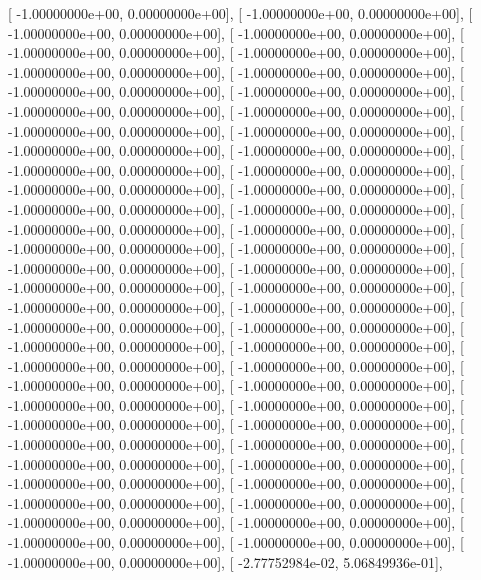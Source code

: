 \documentclass{article}
\begin{document}
       [ -1.00000000e+00,   0.00000000e+00],
       [ -1.00000000e+00,   0.00000000e+00],
       [ -1.00000000e+00,   0.00000000e+00],
       [ -1.00000000e+00,   0.00000000e+00],
       [ -1.00000000e+00,   0.00000000e+00],
       [ -1.00000000e+00,   0.00000000e+00],
       [ -1.00000000e+00,   0.00000000e+00],
       [ -1.00000000e+00,   0.00000000e+00],
       [ -1.00000000e+00,   0.00000000e+00],
       [ -1.00000000e+00,   0.00000000e+00],
       [ -1.00000000e+00,   0.00000000e+00],
       [ -1.00000000e+00,   0.00000000e+00],
       [ -1.00000000e+00,   0.00000000e+00],
       [ -1.00000000e+00,   0.00000000e+00],
       [ -1.00000000e+00,   0.00000000e+00],
       [ -1.00000000e+00,   0.00000000e+00],
       [ -1.00000000e+00,   0.00000000e+00],
       [ -1.00000000e+00,   0.00000000e+00],
       [ -1.00000000e+00,   0.00000000e+00],
       [ -1.00000000e+00,   0.00000000e+00],
       [ -1.00000000e+00,   0.00000000e+00],
       [ -1.00000000e+00,   0.00000000e+00],
       [ -1.00000000e+00,   0.00000000e+00],
       [ -1.00000000e+00,   0.00000000e+00],
       [ -1.00000000e+00,   0.00000000e+00],
       [ -1.00000000e+00,   0.00000000e+00],
       [ -1.00000000e+00,   0.00000000e+00],
       [ -1.00000000e+00,   0.00000000e+00],
       [ -1.00000000e+00,   0.00000000e+00],
       [ -1.00000000e+00,   0.00000000e+00],
       [ -1.00000000e+00,   0.00000000e+00],
       [ -1.00000000e+00,   0.00000000e+00],
       [ -1.00000000e+00,   0.00000000e+00],
       [ -1.00000000e+00,   0.00000000e+00],
       [ -1.00000000e+00,   0.00000000e+00],
       [ -1.00000000e+00,   0.00000000e+00],
       [ -1.00000000e+00,   0.00000000e+00],
       [ -1.00000000e+00,   0.00000000e+00],
       [ -1.00000000e+00,   0.00000000e+00],
       [ -1.00000000e+00,   0.00000000e+00],
       [ -1.00000000e+00,   0.00000000e+00],
       [ -1.00000000e+00,   0.00000000e+00],
       [ -1.00000000e+00,   0.00000000e+00],
       [ -1.00000000e+00,   0.00000000e+00],
       [ -1.00000000e+00,   0.00000000e+00],
       [ -1.00000000e+00,   0.00000000e+00],
       [ -1.00000000e+00,   0.00000000e+00],
       [ -1.00000000e+00,   0.00000000e+00],
       [ -1.00000000e+00,   0.00000000e+00],
       [ -1.00000000e+00,   0.00000000e+00],
       [ -1.00000000e+00,   0.00000000e+00],
       [ -1.00000000e+00,   0.00000000e+00],
       [ -1.00000000e+00,   0.00000000e+00],
       [ -1.00000000e+00,   0.00000000e+00],
       [ -1.00000000e+00,   0.00000000e+00],
       [ -1.00000000e+00,   0.00000000e+00],
       [ -1.00000000e+00,   0.00000000e+00],
       [ -2.77752984e-02,   5.06849936e-01],
\end{document}

